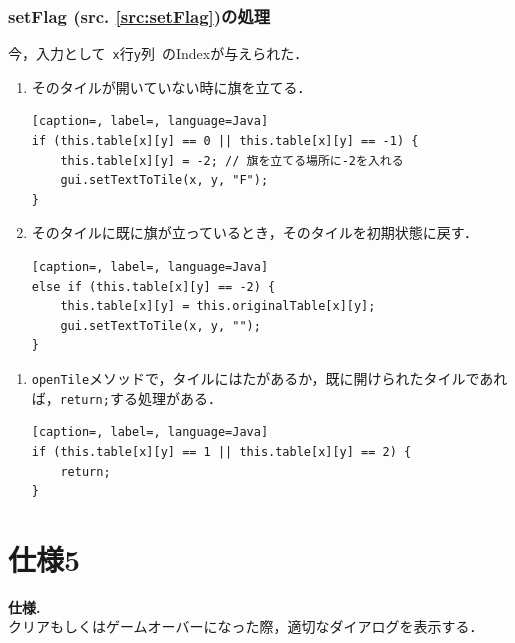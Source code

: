 \documentclass[a4j,11pt]{jsarticle}
\newcommand{\srcref}[1]{src. \ref{#1}}
\newcommand{\met}[1]{\ttfamily #1 \normalfont (\srcref{src:#1})の処理}
\renewcommand{\labelenumi}{\textbf{\arabic{enumi})\ }}
\begin{document}
\subsubsection*{\met{setFlag}}
今，入力として\ \verb|x|行\verb|y|列\ のIndexが与えられた．
\begin{enumerate}
    \item そのタイルが開いていない時に旗を立てる．
          \begin{lstlisting}[caption=, label=, language=Java]
if (this.table[x][y] == 0 || this.table[x][y] == -1) {
    this.table[x][y] = -2; // 旗を立てる場所に-2を入れる
    gui.setTextToTile(x, y, "F");
}
    \end{lstlisting}
    \item そのタイルに既に旗が立っているとき，そのタイルを初期状態に戻す．
          \begin{lstlisting}[caption=, label=, language=Java]
else if (this.table[x][y] == -2) {
    this.table[x][y] = this.originalTable[x][y];
    gui.setTextToTile(x, y, "");
}
    \end{lstlisting}
\end{enumerate}
\dotfill
\begin{enumerate}
    \renewcommand{\labelenumi}{}
    \item \verb|openTile|メソッドで，タイルにはたがあるか，既に開けられたタイルであれば，\verb|return;|する処理がある．
          \begin{lstlisting}[caption=, label=, language=Java]
if (this.table[x][y] == 1 || this.table[x][y] == 2) {
    return;
}
        \end{lstlisting}
\end{enumerate}
\newpage
\section*{仕様5}
\setcounter{section}{5}
\setcounter{subsection}{0}
\begin{screen}
    \textbf{仕様\thesection.}\\
    クリアもしくはゲームオーバーになった際，適切なダイアログを表示する．
\end{screen}
\end{document}
